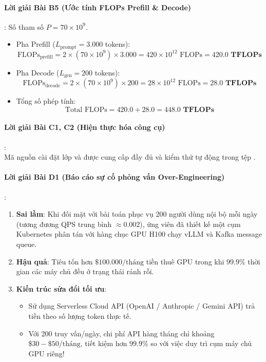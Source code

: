 \paragraph{Lời giải Bài B5 (Ước tính FLOPs Prefill \& Decode)}:
Số tham số $P = 70 \times 10^9$.
\begin{itemize}
  \item Pha Prefill ($L_{\text{prompt}} = 3.000$ tokens):
  \begin{equation*}
  \text{FLOPs}_{\text{prefill}} = 2 \times (70 \times 10^9) \times 3.000 = 420 \times 10^{12}\text{ FLOPs} = \mathbf{420.0\text{ TFLOPs}}
  \end{equation*}
  \item Pha Decode ($L_{\text{gen}} = 200$ tokens):
  \begin{equation*}
  \text{FLOPs}_{\text{decode}} = 2 \times (70 \times 10^9) \times 200 = 28 \times 10^{12}\text{ FLOPs} = \mathbf{28.0\text{ TFLOPs}}
  \end{equation*}
  \item Tổng số phép tính:
  \begin{equation*}
  \text{Total FLOPs} = 420.0 + 28.0 = \mathbf{448.0\text{ TFLOPs}}
  \end{equation*}
\end{itemize}

\paragraph{Lời giải Bài C1, C2 (Hiện thực hóa công cụ)}: \\
Mã nguồn cài đặt lớp  và  được cung cấp đầy đủ và kiểm thử tự động trong tệp .

\paragraph{Lời giải Bài D1 (Báo cáo sự cố phỏng vấn Over-Engineering)}:
\begin{enumerate}
  \item \textbf{Sai lầm}: Khi đối mặt với bài toán phục vụ 200 người dùng nội bộ mỗi ngày (tương đương QPS trung bình $\approx 0.002$), ứng viên đã thiết kế một cụm Kubernetes phân tán với hàng chục GPU H100 chạy vLLM và Kafka message queue.
  \item \textbf{Hậu quả}: Tiêu tốn hơn $\$100.000\text{/tháng}$ tiền thuê GPU trong khi $99.9\%$ thời gian các máy chủ đều ở trạng thái rảnh rỗi.
  \item \textbf{Kiến trúc sửa đổi tối ưu}:
  \begin{itemize}
    \item Sử dụng Serverless Cloud API (OpenAI / Anthropic / Gemini API) trả tiền theo số lượng token thực tế.
    \item Với 200 truy vấn/ngày, chi phí API hàng tháng chỉ khoảng $\$30 - \$50\text{/tháng}$, tiết kiệm hơn $99.9\%$ so với việc duy trì cụm máy chủ GPU riêng!
  \end{itemize}
\end{enumerate}

